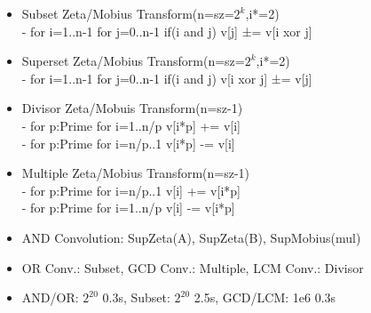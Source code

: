 \begin{itemize}[noitemsep]
    \item Subset Zeta/Mobius Transform(n=sz=$2^k$,i*=2)\\
    - for i=1..n-1 for j=0..n-1 if(i and j) v[j] ±= v[i xor j]
    \item Superset Zeta/Mobius Transform(n=sz=$2^k$,i*=2)\\
    - for i=1..n-1 for j=0..n-1 if(i and j) v[i xor j] ±= v[j]
    \item Divisor Zeta/Mobuis Transform(n=sz-1)\\
    - for p:Prime for i=1..n/p v[i*p] += v[i]\\
    - for p:Prime for i=n/p..1 v[i*p] -= v[i]
    \item Multiple Zeta/Mobius Transform(n=sz-1)\\
    - for p:Prime for i=n/p..1 v[i] += v[i*p]\\
    - for p:Prime for i=1..n/p v[i] -= v[i*p]
    \item AND Convolution: SupZeta(A), SupZeta(B), SupMobius(mul)
    \item OR Conv.: Subset, GCD Conv.: Multiple, LCM Conv.: Divisor
    \item AND/OR: $2^20$ 0.3s, Subset: $2^{20}$ 2.5s, GCD/LCM: 1e6 0.3s
\end{itemize}